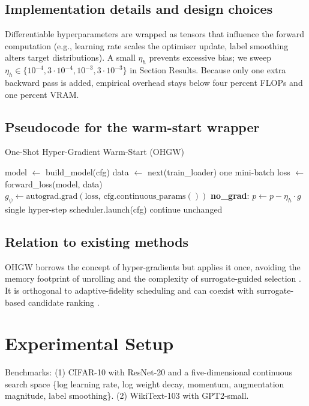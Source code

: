 \documentclass{article}
\begin{document}
\subsection{Implementation details and design choices}
Differentiable hyperparameters are wrapped as tensors that influence the forward computation (e.g., learning rate scales the optimiser update, label smoothing alters target distributions). A small \(\eta_h\) prevents excessive bias; we sweep \(\eta_h\in\{10^{-4}, 3\cdot 10^{-4}, 10^{-3}, 3\cdot 10^{-3}\}\) in Section Results. Because only one extra backward pass is added, empirical overhead stays below four percent FLOPs and one percent VRAM.

\subsection{Pseudocode for the warm-start wrapper}
\begin{algorithm}[H]
\caption{One-Shot Hyper-Gradient Warm-Start (OHGW)}
\begin{algorithmic}[1]
    \State model $\leftarrow$ build\_model(cfg)
    \State data $\leftarrow$ next(train\_loader) \hfill one mini-batch
    \State loss $\leftarrow$ forward\_loss(model, data)
    \State $g_\psi \leftarrow \mathrm{autograd.grad}(\text{loss},\ \text{cfg.continuous\_params}())$
    \State \textbf{no\_grad}:
        \State $p \leftarrow p - \eta_h \cdot g$ \hfill single hyper-step
    \EndFor
    \State scheduler.launch(cfg) \hfill continue unchanged
  \EndFor
\end{algorithmic}
\end{algorithm}

\subsection{Relation to existing methods}
OHGW borrows the concept of hyper-gradients but applies it once, avoiding the memory footprint of unrolling \cite{bertrand-2020-implicit} and the complexity of surrogate-guided selection \cite{nguyen-2019-bayesian}. It is orthogonal to adaptive-fidelity scheduling \cite{jiang-2024-efficient} and can coexist with surrogate-based candidate ranking \cite{khazi-2023-deep}.

\section{Experimental Setup}
Benchmarks: (1) CIFAR-10 with ResNet-20 and a five-dimensional continuous search space \{log learning rate, log weight decay, momentum, augmentation magnitude, label smoothing\}. (2) WikiText-103 with GPT2-small.
\end{document}
